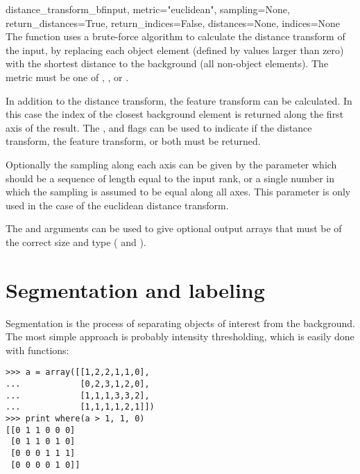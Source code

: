 \begin{funcdesc}{distance_transform_bf}{input, metric="euclidean",
  sampling=None, return_distances=True, return_indices=False, 
  distances=None, indices=None} The function  
   uses a brute-force algorithm to 
  calculate the distance transform of the input, by replacing each object 
  element (defined by values larger than zero) with the shortest distance 
  to the background (all non-object elements).  The metric must be one of 
  , , or 
  .
  
  In addition to the distance transform, the feature transform can be
  calculated. In this case the index of the closest background element is
  returned along the first axis of the result.  The , 
  and  flags can be used to indicate if the distance 
  transform, the feature transform, or both must be returned.
  
  Optionally the sampling along each axis can be given by the 
   parameter which should be a sequence of length equal to 
  the input rank, or a single number in which the sampling is assumed to be 
  equal along all axes. This parameter is only used in the case of the 
  euclidean distance transform.

  The  and  arguments can be used to give 
  optional output arrays that must be of the correct size and type 
  ( and ).

\end{funcdesc}

\section{Segmentation and labeling}
Segmentation is the process of separating objects of interest from the
background. The most simple approach is probably intensity thresholding, 
which is easily done with  functions:
\begin{verbatim}
>>> a = array([[1,2,2,1,1,0],
...            [0,2,3,1,2,0],
...            [1,1,1,3,3,2],
...            [1,1,1,1,2,1]])
>>> print where(a > 1, 1, 0)
[[0 1 1 0 0 0]
 [0 1 1 0 1 0]
 [0 0 0 1 1 1]
 [0 0 0 0 1 0]]
\end{verbatim}


